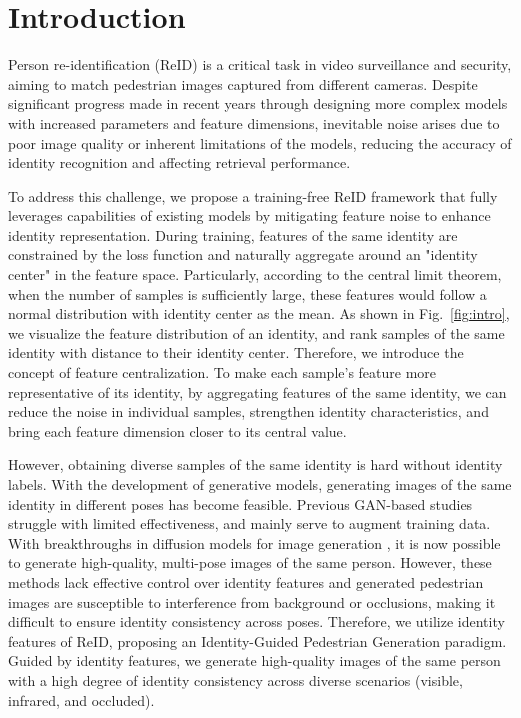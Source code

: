 \section{Introduction}
\label{sec:intro}

Person re-identification (ReID) is a critical task in video surveillance and security, aiming to match pedestrian images captured from different cameras. Despite significant progress made in recent years through designing more complex models with increased parameters and feature dimensions, inevitable noise arises due to poor image quality or inherent limitations of the models, reducing the accuracy of identity recognition and affecting retrieval performance.

To address this challenge, we propose a training-free ReID framework that fully leverages capabilities of existing models by mitigating feature noise to enhance identity representation. During training, features of the same identity are constrained by the loss function and naturally aggregate around an "identity center" in the feature space. Particularly, according to the central limit theorem, when the number of samples is sufficiently large, these features would follow a normal distribution with identity center as the mean. As shown in Fig.~\ref{fig:intro}, we visualize the feature distribution of an identity, and rank samples of the same identity with distance to their identity center. Therefore, we introduce the concept of feature centralization. To make each sample's feature more representative of its identity, by aggregating features of the same identity, we can reduce the noise in individual samples, strengthen identity characteristics, and bring each feature dimension closer to its central value. 

However, obtaining diverse samples of the same identity is hard without identity labels. With the development of generative models, generating images of the same identity in different poses has become feasible. Previous GAN-based studies \cite{ge2018fd, zheng2017unlabeled, zheng2019joint, qian2018pose} struggle with limited effectiveness, and mainly serve to augment training data. With breakthroughs in diffusion models for image generation \cite{ho2020denoising, alexey2020image, zhang2023adding}, it is now possible to generate high-quality, multi-pose images of the same person. However, these methods lack effective control over identity features and generated pedestrian images are susceptible to interference from background or occlusions, making it difficult to ensure identity consistency across poses. Therefore, we utilize identity features of ReID, proposing an Identity-Guided Pedestrian Generation paradigm. Guided by identity features, we generate high-quality images of the same person with a high degree of identity consistency across diverse scenarios (visible, infrared, and occluded).

